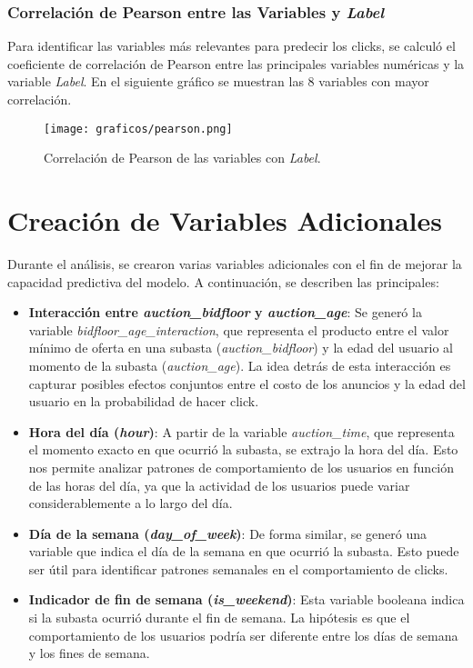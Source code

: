 \documentclass[a4paper,11pt]{article}
\begin{document}
\subsubsection{Correlación de Pearson entre las Variables y \textit{Label}}

Para identificar las variables más relevantes para predecir los clicks, se calculó el coeficiente de correlación de Pearson entre las principales variables numéricas y la variable \textit{Label}. En el siguiente gráfico se muestran las 8 variables con mayor correlación.

\begin{figure}[H]
    \centering
    \texttt{[image: graficos/pearson.png]}
    \caption{Correlación de Pearson de las variables con \textit{Label}.}
\end{figure}

\section{Creación de Variables Adicionales}

Durante el análisis, se crearon varias variables adicionales con el fin de mejorar la capacidad predictiva del modelo. A continuación, se describen las principales:

\begin{itemize}
    \item \textbf{Interacción entre \textit{auction\_bidfloor} y \textit{auction\_age}}: Se generó la variable \textit{bidfloor\_age\_interaction}, que representa el producto entre el valor mínimo de oferta en una subasta (\textit{auction\_bidfloor}) y la edad del usuario al momento de la subasta (\textit{auction\_age}). La idea detrás de esta interacción es capturar posibles efectos conjuntos entre el costo de los anuncios y la edad del usuario en la probabilidad de hacer click.
    
    \item \textbf{Hora del día (\textit{hour})}: A partir de la variable \textit{auction\_time}, que representa el momento exacto en que ocurrió la subasta, se extrajo la hora del día. Esto nos permite analizar patrones de comportamiento de los usuarios en función de las horas del día, ya que la actividad de los usuarios puede variar considerablemente a lo largo del día.
    
    \item \textbf{Día de la semana (\textit{day\_of\_week})}: De forma similar, se generó una variable que indica el día de la semana en que ocurrió la subasta. Esto puede ser útil para identificar patrones semanales en el comportamiento de clicks.
    
    \item \textbf{Indicador de fin de semana (\textit{is\_weekend})}: Esta variable booleana indica si la subasta ocurrió durante el fin de semana. La hipótesis es que el comportamiento de los usuarios podría ser diferente entre los días de semana y los fines de semana.
\end{itemize}
\end{document}
